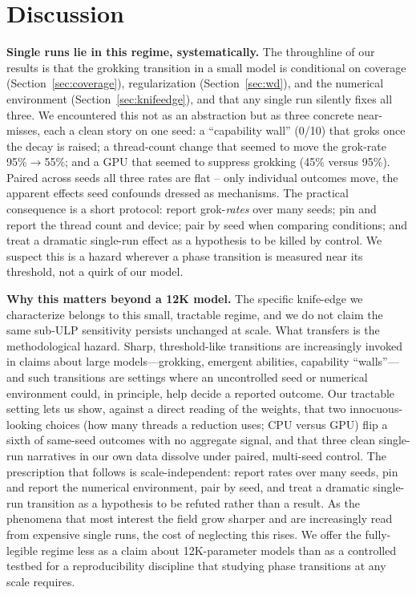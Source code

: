 \documentclass[10pt]{article} %
\begin{document}
\section{Discussion}
\label{sec:discussion}

\textbf{Single runs lie in this regime, systematically.} The throughline of our results is that the
grokking transition in a small model is conditional on coverage (Section~\ref{sec:coverage}),
regularization (Section~\ref{sec:wd}), and the numerical environment (Section~\ref{sec:knifeedge}),
and that any single run silently fixes all three. We encountered this not as an abstraction but as
three concrete near-misses, each a clean story on one seed: a ``capability wall'' (0/10) that groks
once the decay is raised; a thread-count change that seemed to move the grok-rate 95\%$\to$55\%; and
a GPU that seemed to suppress grokking (45\% versus 95\%). Paired across seeds all three rates are
flat -- only individual outcomes move, the apparent effects seed confounds dressed as mechanisms.
The practical consequence is a short protocol: report grok-\emph{rates} over many seeds; pin and
report the thread count and device; pair by seed when comparing conditions; and treat a dramatic
single-run effect as a hypothesis to be killed by control. We suspect this is a hazard wherever a
phase transition is measured near its threshold, not a quirk of our model.

\textbf{Why this matters beyond a 12K model.} The specific knife-edge we characterize belongs to this small, tractable regime, and we do not claim the same sub-ULP sensitivity persists unchanged at scale. What transfers is the methodological hazard. Sharp, threshold-like transitions are increasingly invoked in claims about large models---grokking, emergent abilities, capability ``walls''---and such transitions are settings where an uncontrolled seed or numerical environment could, in principle, help decide a reported outcome. Our tractable setting lets us show, against a direct reading of the weights, that two innocuous-looking choices (how many threads a reduction uses; CPU versus GPU) flip a sixth of same-seed outcomes with no aggregate signal, and that three clean single-run narratives in our own data dissolve under paired, multi-seed control. The prescription that follows is scale-independent: report rates over many seeds, pin and report the numerical environment, pair by seed, and treat a dramatic single-run transition as a hypothesis to be refuted rather than a result. As the phenomena that most interest the field grow sharper and are increasingly read from expensive single runs, the cost of neglecting this rises. We offer the fully-legible regime less as a claim about 12K-parameter models than as a controlled testbed for a reproducibility discipline that studying phase transitions at any scale requires.
\end{document}
